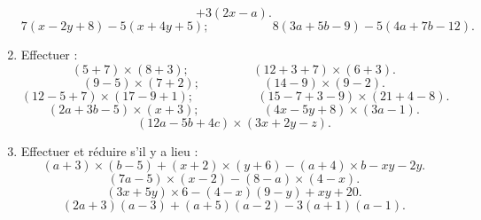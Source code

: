 \documentclass[12 pt]{report}
\theoremstyle{plain}
\newcounter{n}
\begin{document}
\begin{enumerate}
\[+ 3(2x -a).\]
\[7(x - 2y + 8) - 5(x + 4y + 5); \phantom{meowmeow} 8(3a + 5b - 9)
- 5(4a + 7b - 12). \]
\item Effectuer :
\[ (5 + 7)\times(8 + 3); \phantom{meowmeow} (12 + 3 + 7) \times (6 + 3).\]
\[ (9 - 5) \times (7 + 2) ; \phantom{meowmeow} (14 - 9)\times (9 - 2).\]
\[ (12 - 5 + 7) \times (17 - 9 + 1) ; \phantom{meowmeow} (15 - 7 + 3 - 9) \times (21 + 4 - 8). \]
\[ (2a + 3b - 5) \times (x + 3); \phantom{meowmeow} (4x - 5y + 8) \times (3a -1).\]
\[ (12a - 5b + 4c) \times (3x + 2y - z).\]
\item Effectuer et réduire s'il y a lieu : 
\[ (a + 3)\times(b -5)+ (x + 2)\times(y + 6) - (a + 4)\times b - xy - 2y.\]
\[(7a - 5)\times(x - 2) - (8 - a)\times(4 - x).\]
\[(3x + 5y)\times 6 - (4 - x)(9 - y) + xy + 20.\]
\[ (2a + 3)(a - 3) + (a + 5)(a - 2) - 3(a + 1)(a - 1).\]
 \end{enumerate}
 
\end{document}

